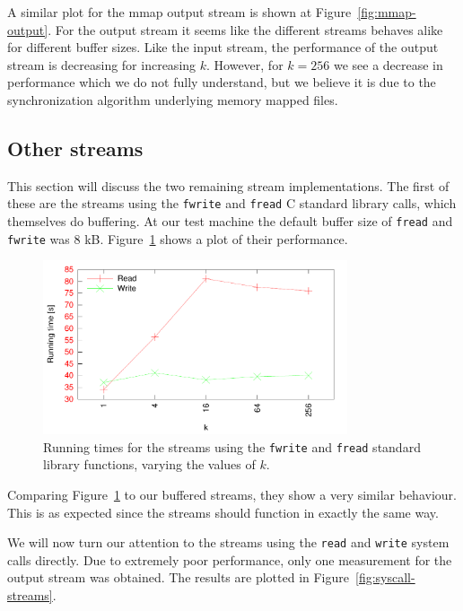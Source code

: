 \documentclass[a4paper,12pt]{article}
\begin{document}
A similar plot for the mmap output stream is shown at
Figure~\ref{fig:mmap-output}. For the output stream it seems like the
different streams behaves alike for different buffer sizes. Like the
input stream, the performance of the output stream is decreasing for
increasing $k$. However, for $k=256$ we see a decrease in performance which we do not fully understand, but we believe it is due to the synchronization algorithm underlying memory mapped files.

\subsection{Other streams}
\label{sec:other-streams}
This section will discuss the two remaining stream
implementations. The first of these are the streams using the
\texttt{fwrite} and \texttt{fread} C standard library calls, which
themselves do buffering. At our test machine the default buffer size
of \texttt{fread} and \texttt{fwrite} was 8
kB. Figure~\ref{fig:fstreams} shows a plot of their performance.

\begin{figure}[h!]
  \centering
  \includegraphics[width=0.8\textwidth]{fstreams}
  \caption{Running times for the streams using the \texttt{fwrite} and
    \texttt{fread} standard library functions, varying the values of
    $k$.}
  \label{fig:fstreams}
\end{figure}

Comparing Figure~\ref{fig:fstreams} to our buffered streams, they show
a very similar behaviour. This is as expected since the streams
should function in exactly the same way.

We will now turn our attention to the streams using the \texttt{read}
and \texttt{write} system calls directly. Due to extremely poor
performance, only one measurement for the output stream was
obtained. The results are plotted in Figure~\ref{fig:syscall-streams}.
\end{document}
